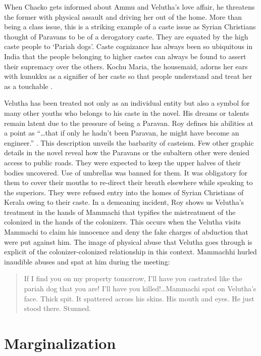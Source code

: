 When Chacko gets informed about Ammu and Velutha's love affair, he threatens the former with physical assault and driving her out of the home. More than being a class issue, this is a striking example of a caste issue as Syrian Christians thought of Paravans to be of a derogatory caste. They are equated by the high caste people to `Pariah dogs'. Caste cognizance has always been so ubiquitous in India that the people belonging to higher castes can always be found to assert their supremacy over the others. Kochu Maria, the housemaid, adorns her ears with kunukku as a signifier of her caste so that people understand and treat her as a touchable \parencite[70]{Roy1997}.

Velutha has been treated not only as an individual entity but also a symbol for many other youths who belongs to his caste in the novel. His dreams or talents remain latent due to the pressure of being a Paravan. Roy defines his abilities at a point as  ``\ldots that if only he hadn't been Paravan, he might have become an engineer.'' \parencite[48]{Roy1997}. This description unveils the barbarity of casteism. Few other graphic details in the novel reveal how the Paravans or the subaltern other were denied access to public roads. They were expected to keep the upper halves of their bodies uncovered. Use of umbrellas was banned for them. It was obligatory for them to cover their mouths to re-direct their breath elsewhere while speaking to the superiors. They were refused entry into the homes of Syrian Christians of Kerala owing to their caste. In a demeaning incident, Roy shows us Velutha's treatment in the hands of Mammachi that typifies the mistreatment of the colonized in the hands of the colonizers. This occurs when the Velutha visits Mammachi to claim his innocence and deny the fake charges of abduction that were put against him. The image of physical abuse that Velutha goes through is explicit of the colonizer-colonized relationship in this context. Mammachhi hurled inaudible abuses and spat at him during the meeting:

\begin{quote}
  If I find you on my property tomorrow, I'll have you castrated like the pariah dog that you are! I'll have you killed!\ldots Mammachi spat on Velutha's face. Thick spit. It spattered across his skins. His mouth and eyes. He just stood there. Stunned. \parencite[284]{Roy1997}
\end{quote}

\section{Marginalization}

